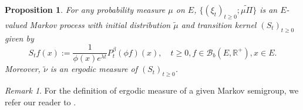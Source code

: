 \documentclass[12pt,a4paper]{amsart}
\numberwithin{equation}{section}
\theoremstyle{plain}
\newtheorem{prop}[thm]{Proposition}
\theoremstyle{definition}
\theoremstyle{remark}
\newtheorem{remark}{Remark}
\begin{document}
\begin{prop} \label{thm:E.15}
	For any probability measure $\mu$ on $E$, $\{(\xi_t)_{t\geq 0}; \widetilde{\mu \Pi}\}$ is an $E$-valued Markov process with initial distribution $\widetilde \mu$ and transition kernel $(S_t)_{t\geq 0}$ given by
\begin{equation} \label{eq:E.17}
	S_t f(x)
	:= \frac{1}{\phi(x)e^{\lambda t}}P_t^\beta (\phi f) (x),
	\quad t\geq 0, f\in \mathcal B_b(E,\mathbb R^+),x\in E.
\end{equation}
	 Moreover, $\widetilde \nu$ is an ergodic measure of $(S_t)_{t\geq 0}$.
\end{prop}

\begin{remark}
	For the definition of ergodic measure of a given Markov semigroup, we refer our reader to \cite[Section 3.2]{DaPratoZabczyk1996Ergodicity}.
\end{remark}
\end{document}
